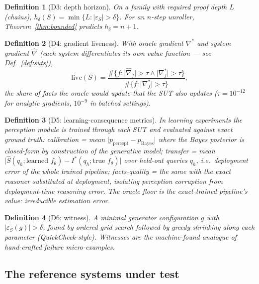 \documentclass[10pt]{article}
\newtheorem{definition}{Definition}[section]
\theoremstyle{remark}
\newcommand{\eps}{\varepsilon}
\newcommand{\sut}{S}
\begin{document}
\begin{definition}[D3: depth horizon]\label{def:horizon}
On a family with required proof depth $L$ (chains), $h_\delta(\sut) = \min\{L :
\lvert\eps_\sut\rvert > \delta\}$. For an $n$-step unroller, Theorem~\ref{thm:bounded} predicts
$h_\delta = n+1$.
\end{definition}

\begin{definition}[D4: gradient liveness]\label{def:liveness}
With oracle gradient $\nabla^*$ and system gradient $\hat\nabla$ (each system differentiates
\emph{its own} value function --- see Def.~\ref{def:suts}),
\[
\mathrm{live}(\sut) = \frac{\#\{f : \lvert\hat\nabla_f\rvert > \tau \wedge
\lvert\nabla^*_f\rvert > \tau\}}{\#\{f : \lvert\nabla^*_f\rvert > \tau\}},
\]
the share of facts the oracle would update that the SUT also updates ($\tau = 10^{-12}$ for
analytic gradients, $10^{-9}$ in batched settings).
\end{definition}

\begin{definition}[D5: learning-consequence metrics]\label{def:learning-metrics}
In learning experiments the perception module is trained \emph{through} each SUT and evaluated
against exact ground truth: \emph{calibration} = mean $\lvert p_{\text{percept}} -
p_{\text{Bayes}}\rvert$ where the Bayes posterior is closed-form by construction of the generative
model; \emph{transfer} = mean $\lvert \hat\sut(q_h; \text{learned } f_\theta) - I^*(q_h;
\text{true } f_\theta)\rvert$ over held-out queries $q_h$, i.e.\ deployment error of the whole
trained pipeline; \emph{facts-quality} = the same with the \emph{exact} reasoner substituted at
deployment, isolating perception corruption from deployment-time reasoning error. The
\emph{oracle floor} is the exact-trained pipeline's value: irreducible estimation error.
\end{definition}

\begin{definition}[D6: witness]\label{def:witness}
A minimal generator configuration $g$ with $\lvert\eps_\sut(g)\rvert > \delta$, found by ordered
grid search followed by greedy shrinking along each parameter (QuickCheck-style). Witnesses are
the machine-found analogue of hand-crafted failure micro-examples.
\end{definition}

\subsection{The reference systems under test}
\end{document}
